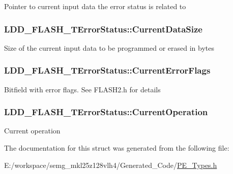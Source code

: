 Pointer to current input data the error status is related to \hypertarget{struct_l_d_d___f_l_a_s_h___t_error_status_ab7c77ef770367308c125aa95c4f0e465}{
\subsubsection[{Current\-Data\-Size}]{ L\-D\-D\-\_\-\-F\-L\-A\-S\-H\-\_\-\-T\-Error\-Status\-::\-Current\-Data\-Size}}\label{struct_l_d_d___f_l_a_s_h___t_error_status_ab7c77ef770367308c125aa95c4f0e465}
Size of the current input data to be programmed or erased in bytes \hypertarget{struct_l_d_d___f_l_a_s_h___t_error_status_a1f8e3f3fd6ceb25960d234254aee7e13}{
\subsubsection[{Current\-Error\-Flags}]{ L\-D\-D\-\_\-\-F\-L\-A\-S\-H\-\_\-\-T\-Error\-Status\-::\-Current\-Error\-Flags}}\label{struct_l_d_d___f_l_a_s_h___t_error_status_a1f8e3f3fd6ceb25960d234254aee7e13}
Bitfield with error flags. See F\-L\-A\-S\-H2.\-h for details \hypertarget{struct_l_d_d___f_l_a_s_h___t_error_status_aa1b99bfba14fdc8379522df15da47e7b}{
\subsubsection[{Current\-Operation}]{ L\-D\-D\-\_\-\-F\-L\-A\-S\-H\-\_\-\-T\-Error\-Status\-::\-Current\-Operation}}\label{struct_l_d_d___f_l_a_s_h___t_error_status_aa1b99bfba14fdc8379522df15da47e7b}
Current operation 

The documentation for this struct was generated from the following file\-:\begin{DoxyCompactItemize}
\item 
E\-:/workspace/semg\-\_\-mkl25z128vlh4/\-Generated\-\_\-\-Code/\hyperlink{_p_e___types_8h}{P\-E\-\_\-\-Types.\-h}\end{DoxyCompactItemize}
